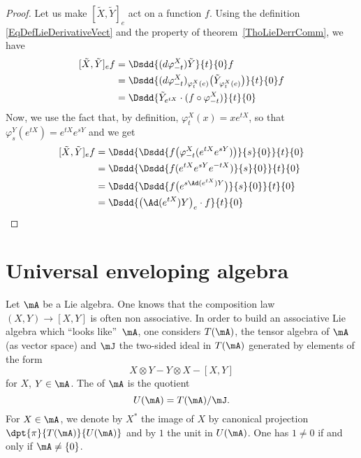 \begin{proof}
	Let us make $[\tilde X,\tilde Y]_e$ act on a function $f$. Using the definition \eqref{EqDefLieDerivativeVect} and the property of theorem~\ref{ThoLieDerrComm}, we have
	\begin{equation}
		\begin{aligned}[]
			[\tilde X,\tilde Y]_ef & =\Dsdd{ (d\varphi_{-t}^X)\tilde Y }{t}{0}f                                               \\
			                       & =\Dsdd{ (d\varphi_{-t}^X)_{\varphi_t^X(e)}\big( \tilde Y_{\varphi_t^X(e)} \big) }{t}{0}f \\
			                       & =\Dsdd{ \tilde Y_{ e^{tX}}\cdot(f\circ\varphi_{-t}^X) }{t}{0}
		\end{aligned}
	\end{equation}
	Now, we use the fact that, by definition, $\varphi_t^X(x)=x e^{tX}$, so that $\varphi_s^Y( e^{tX})= e^{tX} e^{sY}$ and we get
	\begin{equation}
		\begin{aligned}[]
			[\tilde X,\tilde Y]_ef & =\Dsdd{ \Dsdd{ f\big( \varphi_{-t}^X( e^{tX} e^{sY}) \big) }{s}{0} }{t}{0} \\
			                       & =\Dsdd { \Dsdd{ f( e^{tX} e^{sY} e^{-tX}) }{s}{0} } {t}{0}                 \\
			                       & =\Dsdd{ \Dsdd{ f\big(  e^{s\Ad( e^{tX})Y} \big) }{s}{0} }{t}{0}            \\
			                       & =\Dsdd{ \big( \Ad( e^{tX})Y \big)_e\cdot f }{t}{0}
		\end{aligned}
	\end{equation}

\end{proof}

\section{Universal enveloping algebra}  \label{subsec:env_alg}

Let $\mA$ be a Lie algebra. One knows that the composition law $(X,Y)\to[X,Y]$ is often non associative. In order to build an associative Lie algebra which ``looks like''\ $\mA$, one considers $T(\mA)$, the tensor algebra of $\mA$ (as vector space) and $\mJ$ the two-sided ideal in $T(\mA)$ generated by elements of the form
\[
	X\otimes Y-Y\otimes X -[X,Y]
\]
for $X$, $Y\in\mA$. The  of $\mA$ is the quotient 
\begin{equation}
	U(\mA)=T(\mA)/\mJ.
\end{equation}
For $X\in\mA$, we denote by $X^*$ the image of $X$ by canonical projection $\dpt{\pi}{T(\mA)}{U(\mA)}$ and by $1$ the unit in $U(\mA)$. One has $1\neq 0$ if and only if $\mA\neq\{0\}$.

